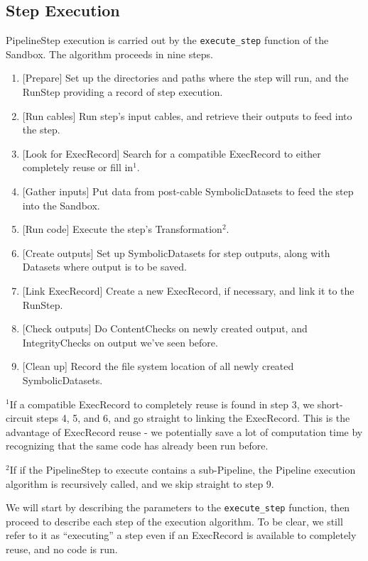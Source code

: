 \documentclass[12pt]{article}
\newcommand{\code}[1]{\texttt{#1}}
\begin{document}
\subsection*{Step Execution}

PipelineStep execution is carried out by the \code{execute\_step} function of
the Sandbox. The algorithm proceeds in nine steps.

\begin{enumerate}
  \item{} [Prepare] Set up the directories and paths where the step will run, and
    the RunStep providing a record of step execution.
  \item{} [Run cables] Run step's input cables, and retrieve their outputs to feed
    into the step.
  \item{} [Look for ExecRecord] Search for a compatible ExecRecord to either
    completely reuse or fill in$^1$.
  \item{} [Gather inputs] Put data from post-cable SymbolicDatasets to feed the
    step into the Sandbox.
  \item{} [Run code] Execute the step's Transformation$^2$.
  \item{} [Create outputs] Set up SymbolicDatasets for step outputs, along with
    Datasets where output is to be saved.
  \item{} [Link ExecRecord] Create a new ExecRecord, if necessary, and link it to
    the RunStep.
  \item{} [Check outputs] Do ContentChecks on newly created output, and
    IntegrityChecks on output we've seen before.
  \item{} [Clean up] Record the file system location of all newly created
    SymbolicDatasets.
\end{enumerate}

\small
$^1$If a compatible ExecRecord to completely reuse is found in step 3, we
short-circuit steps 4, 5, and 6, and go straight to linking the ExecRecord.
This is the advantage of ExecRecord reuse - we potentially save a lot of
computation time by recognizing that the same code has already been run before.

$^2$If if the PipelineStep to execute contains a sub-Pipeline, the Pipeline
execution algorithm is recursively called, and we skip straight to step 9.
\normalsize

We will start by describing the parameters to the \code{execute\_step}
function, then proceed to describe each step of the execution algorithm. To be
clear, we still refer to it as ``executing'' a step even if an ExecRecord is
available to completely reuse, and no code is run.
\end{document}
